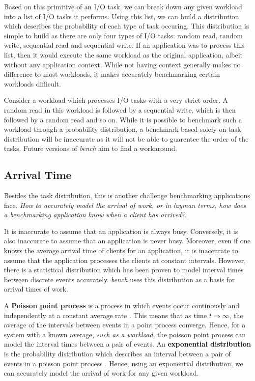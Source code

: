 \documentclass[10pt, author, twocolumn]{article}
\begin{document}
Based on this primitive of an I/O task, we can break down any given workload into a list of I/O tasks it performs. Using this list, we can build a distribution which describes the probability of each type of task occuring. This distribution is simple to build as there are only four types of I/O tasks: random read, random write, sequential read and sequential write. If an application was to process this list, then it would execute the same workload as the original application, albeit without any application context. While not having context generally makes no difference to most workloads, it makes accurately benchmarking certain workloads difficult.

Consider a workload which processes I/O tasks with a very strict order. A random read in this workload is followed by a sequential write, which is then followed by a random read and so on. While it is possible to benchmark such a workload through a probability distribution, a benchmark based solely on task distribution will be inaccurate as it will not be able to guarentee the order of the tasks. Future versions of \textit{bench} aim to find a workaround.

\subsection{Arrival Time}
Besides the task distribution, this is another challenge benchmarking applications face. \textit{How to accurately model the arrival of work, or in layman terms, how does a benchmarking application know when a client has arrived?}. 

It is inaccurate to assume that an application is always busy. Conversely, it is also inaccurate to assume that an application is never busy. Moreover, even if one knows the average arrival time of clients for an application, it is inaccurate to assume that the application processes the clients at constant intervals. However, there is a statistical distribution which has been proven to model interval times between discrete events accurately. \textit{bench} uses this distribution as a basis for arrival times of work. 

A \textbf{Poisson point process} is a process in which events occur continously and independently at a constant average rate \cite{}. This means that as time $t \Rightarrow \infty$, the average of the intervals between events in a point process converge. Hence, for a system with a known average, \textit{such as a workload}, the poisson point process can model the interval times between a pair of events. An \textbf{exponential distribution} is the probability distribution which describes an interval between a pair of events in a poisson point process \cite{}. Hence, using an exponential distribution, we can accurately model the arrival of work for any given workload.
\end{document}
